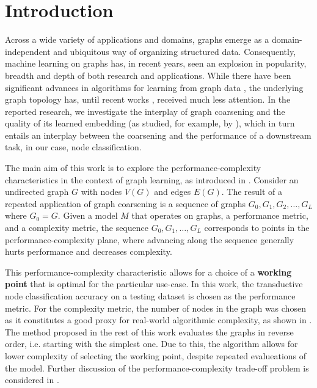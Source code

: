 \section{Introduction}
Across a wide variety of applications and domains, graphs emerge as a domain-independent and ubiquitous way of organizing structured data. Consequently, machine learning on graphs has, in recent years, seen an explosion in popularity, breadth and depth of both research and applications. While there have been significant advances in algorithms for learning from graph data \cite{defferrard_convolutional_2016,kipf_semi-supervised_2017}, the underlying graph topology has, until recent works \cite{topping_understanding_2021,velickovic_geometric_2021}, received much less attention. In the reported research, we investigate the interplay of graph coarsening and the quality of its learned embedding (as studied, for example, by \cite{akyildiz_understanding_2020,makarov_survey_2021}), which in turn entails an interplay between the coarsening and the performance of a downstream task, in our case, node classification.

The main aim of this work is to explore the performance-complexity characteristics in the context of graph learning, as introduced in \cite{prochazka_downstream_2022}. Consider an undirected graph \( G \) with nodes \( V \left( G \right) \) and edges \( E \left( G \right) \). The result of a repeated application of graph coarsening is a sequence of graphs \( G_0, G_1, G_2, \dots, G_L \) where \( G_0 = G \).
Given a model \( M \) that operates on graphs, a performance metric, and a complexity metric, the sequence \( G_0, G_1, \dots, G_L \) corresponds to points in the performance-complexity plane, where advancing along the sequence generally hurts performance and decreases complexity.

This performance-complexity characteristic allows for a choice of a \textbf{working point} that is optimal for the particular use-case. In this work, the transductive node classification accuracy on a testing dataset is chosen as the performance metric. For the complexity metric, the number of nodes in the graph was chosen as it constitutes a good proxy for real-world algorithmic complexity, as shown in \cite{chiang_cluster-gcn_2019}. The method proposed in the rest of this work evaluates the graphs in reverse order, i.e. starting with the simplest one. Due to this, the algorithm allows for lower complexity of selecting the working point, despite repeated evalueations of the model. Further discussion of the performance-complexity trade-off problem is considered in \cite{prochazka_downstream_2022}.
